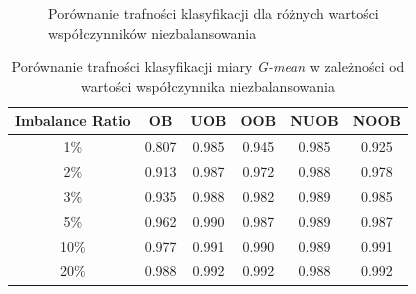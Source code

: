 \begin{figure}[h]
    \centering
    \qquad
    \caption{Porównanie trafności klasyfikacji dla różnych wartości współczynników niezbalansowania}\label{Figure:StaticImbalance}
\end{figure}

\newpage

\begin{table}[ht]
\centering\small%
\renewcommand{\arraystretch}{1.5} 
\begin{tabular}{c c c c c c}
\toprule
Imbalance Ratio & OB & UOB & OOB & NUOB & NOOB \\
\midrule
1\% & 0.807 & 0.985 & 0.945 & 0.985 & 0.925 \\
2\% & 0.913 & 0.987 & 0.972 & 0.988 & 0.978 \\
3\% & 0.935 & 0.988 & 0.982 & 0.989 & 0.985 \\
5\% & 0.962 & 0.990 & 0.987 & 0.989 & 0.987 \\
10\% & 0.977 & 0.991 & 0.990 & 0.989 & 0.991 \\
20\% & 0.988 & 0.992 & 0.992 & 0.988 & 0.992 \\
\bottomrule
\end{tabular}
\caption{Porównanie trafności klasyfikacji miary \textit{G-mean} w zależności od wartości współczynnika niezbalansowania}\label{Tab:ImbalanceRatio}
\end{table}

